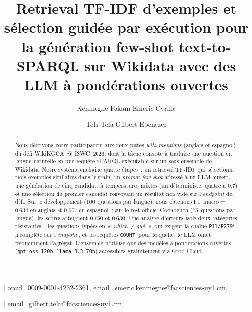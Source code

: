 \documentclass[]{ceurart}
\begin{document}


\title{Retrieval TF-IDF d'exemples et sélection guidée par exécution pour la génération few-shot text-to-SPARQL sur Wikidata avec des LLM à pondérations ouvertes}

\tnotemark[1]

\author[1]{Kenmegne Fokam Emeric Cyrille}[%
orcid=0009-0001-4232-2361,
email=emeric.kenmegne@facsciences-uy1.cm,
]
\cormark[1]

\author[1]{Tela Tela Gilbert Ebenezer}[%
email=gilbert.tela@facsciences-uy1.cm,
]

\address[1]{Department of Computer Science, University of Yaoundé~I, Yaoundé, Cameroun}


\begin{abstract}
Nous décrivons notre participation aux deux pistes \emph{with-mentions} (anglais et espagnol) du défi WikiKGQA~@~ISWC~2026, dont la tâche consiste à traduire une question en langue naturelle en une requête SPARQL exécutable sur un sous-ensemble de Wikidata. Notre système enchaîne quatre étapes~: un retrieval TF-IDF qui sélectionne trois exemples similaires dans le train, un \emph{prompt few-shot} adressé à un LLM ouvert, une génération de cinq candidats à températures mixtes (un déterministe, quatre à 0{,}7) et une sélection du premier candidat renvoyant un résultat non vide sur l'\emph{endpoint} du défi. Sur le développement (100~questions par langue), nous obtenons F1~macro = 0{,}634 en anglais et 0{,}607 en espagnol~; sur le test officiel Codabench (75~questions par langue), les scores atteignent 0{,}650 et 0{,}630. Une analyse d'erreurs isole deux catégories résistantes~: les questions typées en \emph{«~which~/~qué~»}, qui exigent la chaîne \texttt{P31/P279*} incomplète sur l'\emph{endpoint}, et les requêtes \texttt{COUNT}, pour lesquelles le LLM omet fréquemment l'agrégat. L'ensemble n'utilise que des modèles à pondérations ouvertes (\texttt{gpt-oss-120b}, \texttt{llama-3.3-70b}) accessibles gratuitement via Groq Cloud.
\end{abstract}
\end{document}
